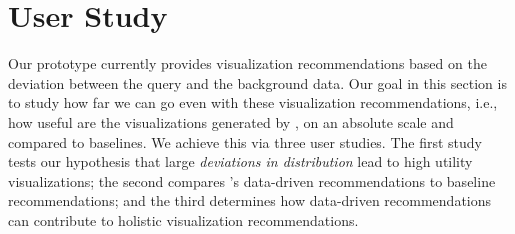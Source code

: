 
\section{User Study}
\label{sec:user_study}

Our \SeeDB prototype currently provides 
visualization recommendations based on the 
deviation between the query and the background data.
Our goal in this section is to study how
far we can go even with these visualization
recommendations, i.e., how useful are the 
visualizations generated by \SeeDB, on an absolute scale
and compared to baselines. 
We achieve this via three user studies.
The first study tests our hypothesis that large 
{\it deviations in distribution} 
lead to high utility visualizations;
the second compares \SeeDB's data-driven recommendations 
to baseline recommendations; and the third
determines how data-driven 
recommendations can contribute to 
holistic visualization recommendations. 


